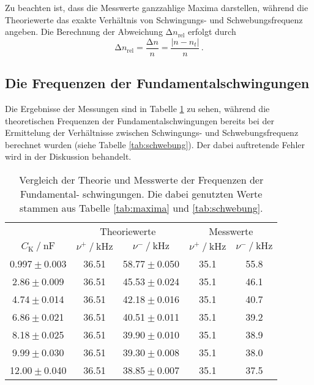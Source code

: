 Zu beachten ist, dass die Messwerte
ganzzahlige Maxima darstellen, während die Theoriewerte das exakte Verhältnis von
Schwingungs- und Schwebungsfrequenz angeben. Die Berechnung der Abweichung $\increment n_{\text{rel}}$ erfolgt durch
\begin{equation}
    \increment n_{\text{rel}}=\frac{\increment n}{n}=\frac{\left|n-n_{t}\right|}{n} \, .
\end{equation}


\subsection{Die Frequenzen der Fundamentalschwingungen}

Die Ergebnisse der Messungen sind in Tabelle \ref{tab:vergleich} zu sehen, während die
theoretischen Frequenzen der Fundamentalschwingungen bereits bei der
Ermittelung der Verhältnisse zwischen Schwingungs- und Schwebungsfrequenz berechnet
wurden (siehe Tabelle \ref{tab:schwebung}). Der dabei auftretende Fehler wird in der Diskussion behandelt.
\begin{table}
    \centering
    \caption{   Vergleich der Theorie und Messwerte der Frequenzen der Fundamental-
                schwingungen. Die dabei genutzten Werte stammen aus Tabelle
                \ref{tab:maxima} und \ref{tab:schwebung}.}
    \label{tab:vergleich}
    \begin{tabular}{c c c c c}
    \toprule
    & \multicolumn{2}{c}{Theoriewerte} & \multicolumn{2}{c}{Messwerte} \\
    \cmidrule(lr){2-3}\cmidrule(lr){4-5}
    {${C_\text{K}} \mathbin{/} \unit{\nano\farad}$} &
    {$\nu^+ \mathbin{/} \unit{\kilo\hertz}$} & {$\nu^- \mathbin{/} \unit{\kilo\hertz}$} &
    {$\nu^+ \mathbin{/} \unit{\kilo\hertz}$} & {$\nu^- \mathbin{/} \unit{\kilo\hertz}$} \\
    \midrule
    0.997${}\pm{}$0.003 &    36.51 & 58.77${}\pm{}$0.050 &    35.1 &   55.8 \\
     2.86${}\pm{}$0.009 &    36.51 & 45.53${}\pm{}$0.024 &    35.1 &   46.1 \\
     4.74${}\pm{}$0.014 &    36.51 & 42.18${}\pm{}$0.016 &    35.1 &   40.7 \\
     6.86${}\pm{}$0.021 &    36.51 & 40.51${}\pm{}$0.011 &    35.1 &   39.2 \\
     8.18${}\pm{}$0.025 &    36.51 & 39.90${}\pm{}$0.010 &    35.1 &   38.9 \\
     9.99${}\pm{}$0.030 &    36.51 & 39.30${}\pm{}$0.008 &    35.1 &   38.0 \\
    12.00${}\pm{}$0.040 &    36.51 & 38.85${}\pm{}$0.007 &    35.1 &   37.5 \\
    \bottomrule
    \end{tabular}
\end{table}


